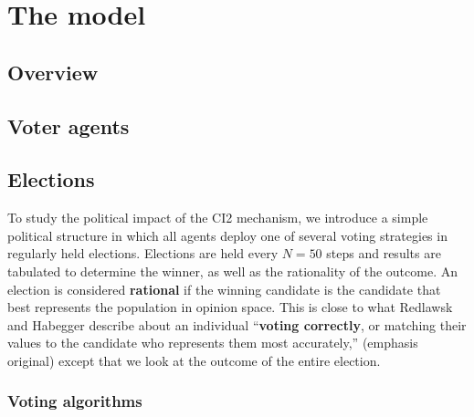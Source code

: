 \section{The model}
\label{sec:model}

\subsection{Overview}


\subsection{Voter agents}


\subsection{Elections}


To study the political impact of the CI2 mechanism, we introduce a simple
political structure in which all agents deploy one of several voting strategies
in regularly held elections. Elections are held every $N=50$ steps and results
are tabulated to determine the winner, as well as the rationality of the
outcome. An election is considered \textbf{rational} if the winning candidate
is the candidate that best represents the population in opinion space. This is
close to what Redlawsk and Habegger describe about an individual
``\textbf{voting correctly}, or matching their values to the candidate who
represents them most accurately,''\cite[p.8]{redlawsk_citizens_2020} (emphasis
original) except that we look at the outcome of the entire election. 

\subsubsection{Voting algorithms}

